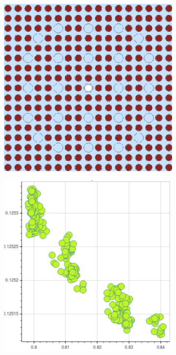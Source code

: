 \clearpage

\begin{figure}[h!]
\centering
\begin{subfigure}{0.45\textwidth}
  \centering
  \includegraphics[width=0.9\linewidth]{figures/unsupervised/features/assm-16/geometry}
  \caption{}
  \label{fig:chap10-capt-mean-spect-ind-geom}
\end{subfigure}%
\begin{subfigure}{0.45\textwidth}
  \centering
  \includegraphics[width=0.9\linewidth]{figures/unsupervised/features/assm-16/u238-capt/mean-spect-ind/mgxs}

\end{subfigure}
\end{figure}
